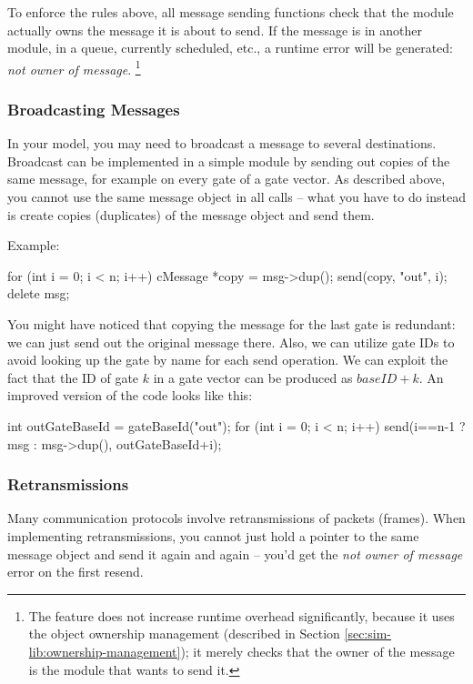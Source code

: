 To enforce the rules above, all message sending functions check that the
module actually owns the message it is about to send. If the message is in
another module, in a queue, currently scheduled, etc., a runtime error
will be generated: \textit{not owner of message}.
  \footnote{The feature does not increase runtime overhead significantly, because
  it uses the object ownership management (described in
  Section \ref{sec:sim-lib:ownership-management});
  it merely checks that the owner of the message is the module that
  wants to send it.}


\subsubsection{Broadcasting Messages}
\label{sec:simple-modules:broadcasting-messages}

In your model, you may need to broadcast a message to several destinations.
Broadcast can be implemented in a simple module by sending out copies
of the same message, for example on every gate of a gate vector.
As described above, you cannot use the same message object in all
 calls -- what you have to do instead is
create copies (duplicates) of the message object and send them.

Example:

\begin{cpp}
for (int i = 0; i < n; i++) {
    cMessage *copy = msg->dup();
    send(copy, "out", i);
}
delete msg;
\end{cpp}

You might have noticed that copying the message for the last gate is
redundant: we can just send out the original message there.
Also, we can utilize gate IDs to avoid looking up the gate by name
for each send operation. We can exploit the fact that the ID of gate
$k$ in a gate vector can be produced as ${baseID} + k$.
An improved version of the code looks like this:

\begin{cpp}
int outGateBaseId = gateBaseId("out");
for (int i = 0; i < n; i++)
    send(i==n-1 ? msg : msg->dup(), outGateBaseId+i);
\end{cpp}


\subsubsection{Retransmissions}
\label{sec:simple-modules:retransmissions}

Many communication protocols involve retransmissions of packets (frames).
When implementing retransmissions, you cannot just hold a pointer
to the same message object and send it again and again -- you'd get
the \textit{not owner of message} error on the first resend.


